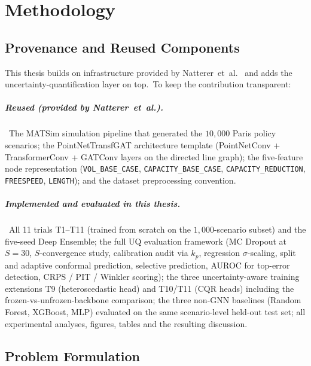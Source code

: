 
\chapter{Methodology}\label{chapter:methodology}

\section{Provenance and Reused Components}\label{sec:provenance}

This thesis builds on infrastructure provided by Natterer~et~al.~\cite{natterer2025ml} and adds the uncertainty-quantification layer on top.\ To keep the contribution transparent:

\paragraph{Reused (provided by Natterer~et~al.).}\ The MATSim simulation pipeline that generated the $10{,}000$ Paris policy scenarios; the PointNetTransfGAT architecture template (PointNetConv + TransformerConv + GATConv layers on the directed line graph); the five-feature node representation (\texttt{VOL\_BASE\_CASE}, \texttt{CAPACITY\_BASE\_CASE}, \texttt{CAPACITY\_REDUCTION}, \texttt{FREESPEED}, \texttt{LENGTH}); and the dataset preprocessing convention.

\paragraph{Implemented and evaluated in this thesis.}\ All 11 trials T1--T11 (trained from scratch on the $1{,}000$-scenario subset) and the five-seed Deep Ensemble; the full UQ evaluation framework (MC Dropout at $S = 30$, $S$-convergence study, calibration audit via $k_p$, regression $\sigma$-scaling, split and adaptive conformal prediction, selective prediction, AUROC for top-error detection, CRPS / PIT / Winkler scoring); the three uncertainty-aware training extensions T9 (heteroscedastic head) and T10/T11 (CQR heads) including the frozen-vs-unfrozen-backbone comparison; the three non-GNN baselines (Random Forest, XGBoost, MLP) evaluated on the same scenario-level held-out test set; all experimental analyses, figures, tables and the resulting discussion.

\section{Problem Formulation}\label{sec:problem_form}

